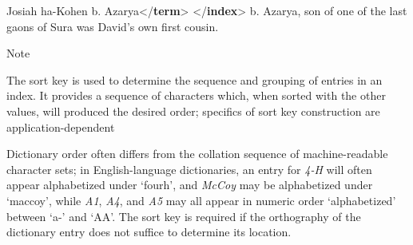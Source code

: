 \begin{reflist}
\begin{sansreflist}
\begin{reflist}
Josiah ha-Kohen b. Azarya{</\textbf{term}>}\mbox{}\newline 
{</\textbf{index}>} b. Azarya, son of one of the last gaons of Sura was David's own first\mbox{}\newline 
 cousin.
    \item[{Note}]
  \par
The sort key is used to determine the sequence and grouping of entries in an index. It provides a sequence of characters which, when sorted with the other values, will produced the desired order; specifics of sort key construction are application-dependent\par
Dictionary order often differs from the collation sequence of machine-readable character sets; in English-language dictionaries, an entry for \textit{4-H} will often appear alphabetized under ‘fourh’, and \textit{McCoy} may be alphabetized under ‘maccoy’, while \textit{A1}, \textit{A4}, and \textit{A5} may all appear in numeric order ‘alphabetized’ between ‘a-’ and ‘AA’. The sort key is required if the orthography of the dictionary entry does not suffice to determine its location.
\end{reflist}  
\end{sansreflist}  
\end{reflist}  
